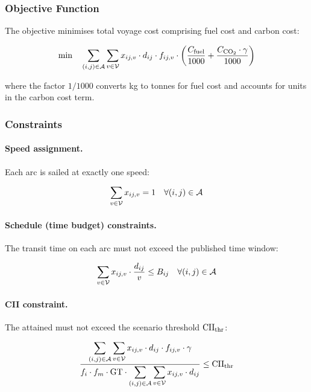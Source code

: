 \subsubsection{Objective Function}
\label{sec:model:obj}

The objective minimises total voyage cost comprising fuel cost and
\ETS{} carbon cost:

\begin{equation}
  \min \quad
  \sum_{(i,j)\in\mathcal{A}} \sum_{v\in\mathcal{V}}
    x_{ij,v} \cdot d_{ij} \cdot f_{ij,v}
    \cdot \left( \frac{C_{\mathrm{fuel}}}{1000}
                 + \frac{C_{\mathrm{CO}_2} \cdot \gamma}{1000} \right)
  \label{eq:obj}
\end{equation}

\noindent where the factor $1/1000$ converts kg to tonnes for fuel cost
and accounts for units in the carbon cost term.

\subsubsection{Constraints}
\label{sec:model:constraints}

\paragraph{Speed assignment.}
Each arc is sailed at exactly one speed:

\begin{equation}
  \sum_{v \in \mathcal{V}} x_{ij,v} = 1 \quad \forall (i,j) \in \mathcal{A}
  \label{eq:speedassign}
\end{equation}

\paragraph{Schedule (time budget) constraints.}
The transit time on each arc must not exceed the published time window:

\begin{equation}
  \sum_{v \in \mathcal{V}} x_{ij,v} \cdot \frac{d_{ij}}{v} \leq B_{ij}
  \quad \forall (i,j) \in \mathcal{A}
  \label{eq:schedule}
\end{equation}

\paragraph{CII constraint.}
The attained \CII{} must not exceed the scenario threshold
$\mathrm{CII}_{\mathrm{thr}}$:

\begin{equation}
  \frac{\displaystyle\sum_{(i,j)\in\mathcal{A}} \sum_{v\in\mathcal{V}}
          x_{ij,v} \cdot d_{ij} \cdot f_{ij,v} \cdot \gamma}
       {f_i \cdot f_m \cdot \mathrm{GT} \cdot
        \displaystyle\sum_{(i,j)\in\mathcal{A}} \sum_{v\in\mathcal{V}}
          x_{ij,v} \cdot d_{ij}}
  \leq \mathrm{CII}_{\mathrm{thr}}
  \label{eq:cii_frac}
\end{equation}

